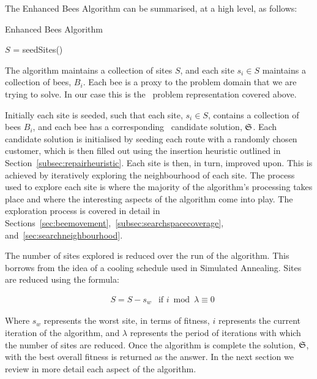 The Enhanced Bees Algorithm can be summarised, at a high level, as follows:

\begin{algorithm}[H]
   \caption{Enhanced Bees Algorithm}
   $S$ = seedSites() \\

\end{algorithm}

The algorithm maintains a collection of sites $S$, and each site $s_i \in S$ maintains a collection of bees, $B_i$. Each bee is a proxy to the problem domain that we are trying to solve. In our case this is the \VRP\ problem representation covered above.

Initially each site is seeded, such that each site, $s_i \in S$, contains a collection of bees $B_i$, and each bee has a corresponding \VRP\ candidate solution, $\mathfrak{S}$. Each candidate solution is initialised by seeding each route with a randomly chosen customer, which is then filled out using the insertion heuristic outlined in Section~\ref{subsec:repairheuristic}. Each site is then, in turn, improved upon. This is achieved by iteratively exploring the neighbourhood of each site. The process used to explore each site is where the majority of the algorithm's processing takes place and where the interesting aspects of the algorithm come into play. The exploration process is covered in detail in Sections~\ref{sec:beemovement},~\ref{subsec:searchspacecoverage}, and~\ref{sec:searchneighbourhood}.

The number of sites explored is reduced over the run of the algorithm. This borrows from the idea of a cooling schedule used in Simulated Annealing. Sites are reduced using the formula:

\begin{align}
   & S = S - s_w & \text{if $i \bmod{\lambda} \equiv 0$}
\end{align}

Where $s_w$ represents the worst site, in terms of fitness, $i$ represents the current iteration of the algorithm, and $\lambda$ represents the period of iterations with which the number of sites are reduced. Once the algorithm is complete the solution, $\mathfrak{S}$, with the best overall fitness is returned as the answer. In the next section we review in more detail each aspect of the algorithm.


